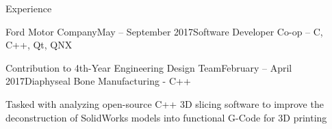 \documentclass{resume} %
\begin{document}
\begin{rSection}{Experience}
\begin{rSubsection}{Ford Motor Company}{May -- September 2017}{Software Developer Co-op -- C, C++, Qt, QNX}{}
\end{rSubsection}

\begin{rSubsection}{Contribution to 4th-Year Engineering Design Team}{February -- April 2017}{Diaphyseal Bone Manufacturing - C++}{}
\item Tasked with analyzing open-source C++ 3D slicing software to improve the deconstruction of SolidWorks models into functional G-Code for 3D printing
\end{rSubsection}

\end{rSection}


\end{document}
